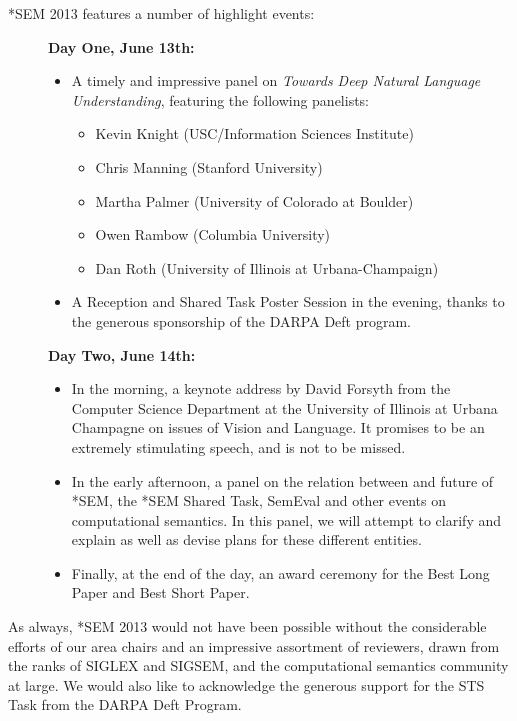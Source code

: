 *SEM 2013 features a number of highlight events:
%
\begin{description}
\item[] \textbf{Day One, June 13th:}\\[-2ex]
  \begin{itemize}
  \item A timely and impressive panel on \textit{Towards Deep
      Natural Language Understanding}, featuring the following
    panelists:

    \begin{itemize}
    \item {Kevin Knight} (USC/Information Sciences Institute)
    \item {Chris Manning} (Stanford University)
    \item {Martha Palmer} (University of Colorado at Boulder)
    \item {Owen Rambow} (Columbia University)
    \item {Dan Roth} (University of Illinois at Urbana-Champaign)
    \end{itemize}

  \item A Reception and Shared Task Poster Session in the evening,
    thanks to the generous sponsorship of the DARPA Deft program. \\
  \end{itemize}
\item[] \textbf{Day Two, June 14th:}\\[-2ex]
    \begin{itemize}
    \item In the morning, a keynote address by David Forsyth
      from the Computer Science Department at the University of Illinois
      at Urbana Champagne on issues of Vision and Language. It promises
      to be an
      extremely stimulating speech, and is not to be missed.


    \item In the early afternoon, a panel on the relation between and
      future of *SEM, the *SEM Shared Task, SemEval and other events on
      computational semantics. In this panel, we will attempt to clarify
      and explain as well as devise plans for these different entities.

    \item Finally, at the end of the day, an award ceremony for the Best Long Paper and Best Short Paper. 
    \end{itemize}
\end{description}
%
As always, *SEM 2013 would not have been possible without the
considerable efforts of our area chairs and an impressive assortment of reviewers, drawn from the
ranks of SIGLEX and SIGSEM, and the computational semantics community at
large. We would also like to acknowledge the generous support for the STS Task from the DARPA Deft Program. 

